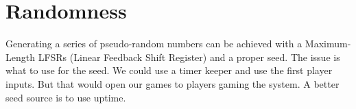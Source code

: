 
\section{Randomness}
Generating a series of pseudo-random numbers can be achieved with a Maximum-Length LFSRs (Linear Feedback Shift Register) and a proper seed. The issue is what to use for the seed. We could use a timer keeper and use the first player inputs. But that would open our games to players gaming the system. A better seed source is to use uptime.

